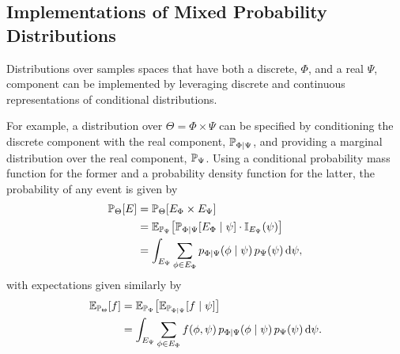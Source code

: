 \subsection{Implementations of Mixed Probability Distributions}

Distributions over samples spaces that have both a discrete, $\Phi$,
and a real $\Psi$, component can be implemented by leveraging 
discrete and continuous representations of conditional distributions.  

For example, a distribution over $\Theta = \Phi \times \Psi$ can be
specified by conditioning the discrete component with the real
component, $\mathbb{P}_{\Phi \mid \Psi}$, and providing a marginal distribution
over the real component, $\mathbb{P}_{\Psi}$.  Using a conditional
probability mass function for the former and a probability density function
for the latter, the probability of any event is given by
%
\begin{align*}
\mathbb{P}_{\Theta} \! \left[ E \right]
&=
\mathbb{P}_{\Theta} \! \left[ E_{\Phi} \times E_{\Psi} \right]
\\
&=
\mathbb{E}_{\mathbb{P}_{\Psi}} \! \left[
\mathbb{P}_{\Phi \mid \Psi} \! \left[  E_{\Phi} \mid \psi \right]
\cdot
\mathbb{I}_{E_{\Psi}} \! \left( \psi \right)
\right] 
\\
&= 
\int_{E_{\Psi} }
\sum_{\phi \in E_{\Phi} } p_{\Phi \mid \Psi} \! \left( \phi \mid \psi \right)
p_{\Psi} \! \left( \psi \right) \mathrm{d} \psi,
\end{align*}
%
with expectations given similarly by
%
\begin{align*}
\mathbb{E}_{\mathbb{P}_{\Theta}} \! \left[ f \right]
&=
\mathbb{E}_{\mathbb{P}_{\Psi}} \! \left[
\mathbb{E}_{\mathbb{P}_{\Phi \mid \Psi}} \! \left[  f \mid \psi \right]
\right] 
\\
&= 
\int_{E_{\Psi} } \sum_{\phi \in E_{\Phi} } f \! \left( \phi, \psi \right) 
p_{\Phi \mid \Psi} \! \left( \phi \mid \psi \right)
p_{\Psi} \! \left( \psi \right) \mathrm{d} \psi.
\end{align*}

